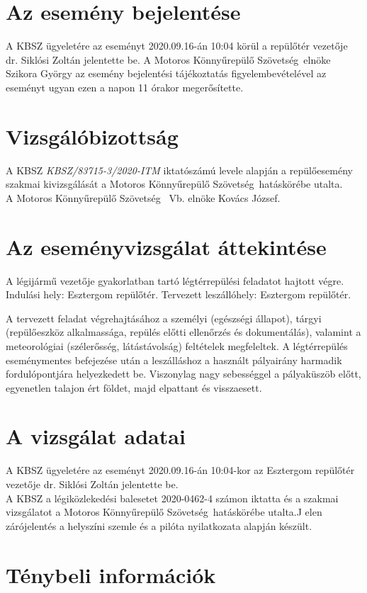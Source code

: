 \documentclass[a4paper,10pt]{article}
\newcommand{\mksz}{Motoros Könnyűrepülő Szövetség\ }
\begin{document}
\section*{Az esemény bejelentése}
A KBSZ ügyeletére az eseményt 2020.09.16-án 10:04 körül a repülőtér
vezetője dr. Siklósi Zoltán jelentette be. A \mksz  elnöke Szikora György
az esemény bejelentési tájékoztatás figyelembevételével az eseményt ugyan
ezen a napon 11 órakor megerősítette.

\section*{Vizsgálóbizottság}
A KBSZ \textit{KBSZ/83715-3/2020-ITM} iktatószámú levele alapján a 
repülőesemény szakmai kivizsgálását a \mksz hatáskörébe utalta.\\A \mksz
Vb. elnöke Kovács József.

\section*{Az eseményvizsgálat áttekintése}
A légijármű vezetője gyakorlatban tartó légtérrepülési feladatot hajtott
végre.
Indulási hely: Esztergom repülőtér. Tervezett leszállóhely: Esztergom
repülőtér.

A tervezett feladat végrehajtásához a személyi (egészségi állapot), tárgyi 
(repülőeszköz alkalmassága, repülés előtti ellenőrzés és dokumentálás), 
valamint a meteorológiai (szélerősség, látástávolság) feltételek
megfeleltek. 
A légtérrepülés eseménymentes befejezése után a leszálláshoz a használt 
pályairány harmadik fordulópontjára helyezkedett be. Viszonylag nagy 
sebességgel a pályaküszöb előtt, egyenetlen talajon ért földet, majd
elpattant és visszaesett.

\section*{A vizsgálat adatai}
A KBSZ ügyeletére az eseményt 2020.09.16-án 10:04-kor az Esztergom 
repülőtér vezetője dr. Siklósi Zoltán jelentette be.
\\

A KBSZ a légiközlekedési balesetet 2020-0462-4 számon iktatta és a szakmai 
vizsgálatot a \mksz hatáskörébe utalta.J elen zárójelentés a helyszíni 
szemle és a pilóta nyilatkozata alapján készült.

\section{Ténybeli információk}
\end{document}
